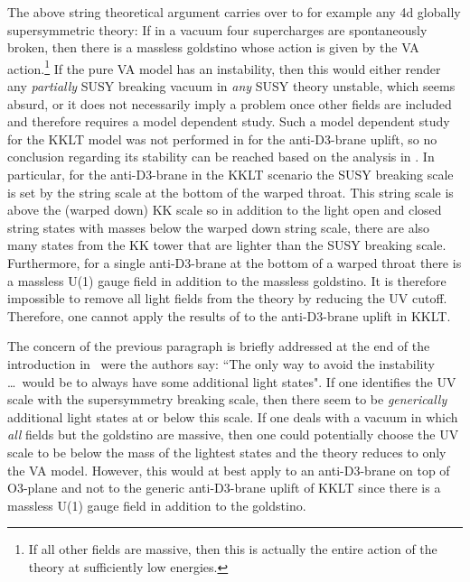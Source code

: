 \documentclass[11pt]{article}
\begin{document}
The above string theoretical argument carries over to for example any 4d globally supersymmetric theory: If in a vacuum four supercharges are spontaneously broken, then there is a massless goldstino whose action is given by the VA action.\footnote{If all other fields are massive, then this is actually the entire action of the theory at sufficiently low energies.} If the pure VA model has an instability, then this would either render any \emph{partially} SUSY breaking vacuum in \emph{any} SUSY theory unstable, which seems absurd, or it does not necessarily imply a problem once other fields are included and therefore requires a model dependent study. Such a model dependent study for the KKLT model was not performed in \cite{DallAgata:2022abm} for the anti-D3-brane uplift, so no conclusion regarding its stability can be reached based on the analysis in \cite{DallAgata:2022abm}. In particular, for the anti-D3-brane in the KKLT scenario the SUSY breaking scale is set by the string scale at the bottom of the warped throat. This string scale is above the (warped down) KK scale so in addition to the light open and closed string states with masses below the warped down string scale, there are also many states from the KK tower that are lighter than the SUSY breaking scale. Furthermore, for a single anti-D3-brane at the bottom of a warped throat there is a massless U(1) gauge field \cite{GarciadelMoral:2017vnz, Cribiori:2019hod} in addition to the massless goldstino. It is therefore impossible to remove all light fields from the theory by reducing the UV cutoff. Therefore, one cannot apply the results of \cite{DallAgata:2022abm} to the anti-D3-brane uplift in KKLT. 

The concern of the previous paragraph is briefly addressed at the end of the introduction in~\cite{DallAgata:2022abm} were the authors say: ``The only way to avoid the instability \ldots~would be to always have some additional light states". If one identifies the UV scale with the supersymmetry breaking scale, then there seem to be \emph{generically} additional light states at or below this scale. If one deals with a vacuum in which \emph{all} fields but the goldstino are massive, then one could potentially choose the UV scale to be below the mass of the lightest states and the theory reduces to only the VA model. However, this would at best apply to an anti-D3-brane on top of O3-plane and not to the generic anti-D3-brane uplift of KKLT since there is a massless U(1) gauge field in addition to the goldstino.

\end{document}
